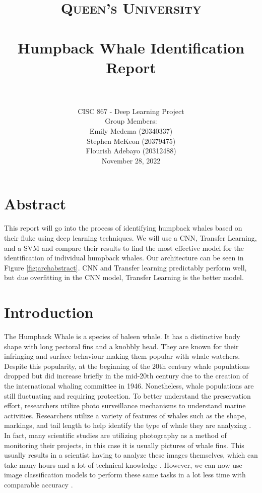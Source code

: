 \documentclass[paper=a4, fontsize=11pt]{scrartcl}
\title{
		\usefont{OT1}{bch}{b}{n}
		\normalfont \normalsize \textsc{Queen's University} \\ [25pt]
		\horrule{0.5pt} \\[0.4cm]
		\huge Humpback Whale Identification Report \\
		\horrule{2pt} \\[0.5cm]
}
\author{
    \normalfont 
      CISC 867 - Deep Learning Project \\
    \normalfont
    Group Members: \\ 
    \normalsize
    Emily Medema (20340337) \\ 
    \normalsize
    Stephen McKeon (20379475) \\ 
    \normalsize
    Flourish Adebayo (20312488) \\
    November 28, 2022 \\ [3pt]}
\date{\vspace{-5ex}}
\numberwithin{equation}{section}		%
\numberwithin{table}{section}				%
\begin{document}
\maketitle
\needspace{15em}
\section*{Abstract}\label{sec: abstract}

This report will go into the process of identifying humpback whales based on their fluke using deep learning techniques. We will use a CNN, Transfer Learning, and a SVM and compare their results to find the most effective model for the identification of individual humpback whales. Our architecture can be seen in Figure \ref{fig:archabstract}. CNN and Transfer learning predictably perform well, but due overfitting in the CNN model, Transfer Learning is the better model.

\newpage 

\section*{Introduction}\label{sec: intro}
The Humpback Whale is a species of baleen whale. It has a distinctive body shape with long pectoral fins and a knobbly head. They are known for their infringing and surface behaviour making them popular with whale watchers\cite{kareiva2006whales}. Despite this popularity, at the beginning of the 20th century whale populations dropped but did increase briefly in the mid-20th century due to the creation of the international whaling committee in 1946\cite{henderson2022behavior}. Nonetheless, whale populations are still fluctuating and requiring protection. To better understand the preservation effort, researchers utilize photo surveillance mechanisms to understand marine activities. Researchers utilize a variety of features of whales such as the shape, markings, and tail length to help identify the type of whale they are analyzing \cite{JaisakthiS.M.2017Awms}. In fact, many scientific studies are utilizing photography as a method of monitoring their projects, in this case it is usually pictures of whale fins. This usually results in a scientist having to analyze these images themselves, which can take many hours and a lot of technical knowledge \cite{JaisakthiS.M.2017Awms}. However, we can now use image classification models to perform these same tasks in a lot less time with comparable accuracy \cite{JaisakthiS.M.2017Awms}.
\end{document}
